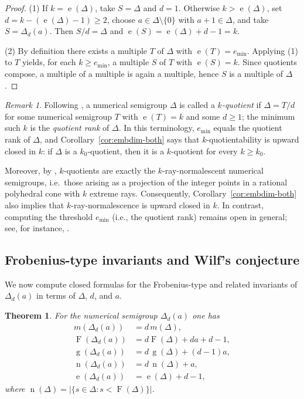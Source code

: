 \documentclass[12pt,a4paper]{amsart}
\newtheorem{theorem}{Theorem}[section]
\theoremstyle{definition}
\theoremstyle{remark}
\newtheorem*{remark}{Remark}
\begin{document}
\begin{proof}
(1) If $k=\operatorname{e}(\Delta)$, take $S=\Delta$ and $d=1$. Otherwise $k>\operatorname{e}(\Delta)$, set
$d=k-(\operatorname{e}(\Delta)-1)\ge 2$, choose $a\in\Delta\setminus\{0\}$ with $a+1\in\Delta$, and take
$S=\Delta_d(a)$. Then $S/d=\Delta$ and $\operatorname{e}(S)=\operatorname{e}(\Delta)+d-1=k$.

(2) By definition there exists a multiple $T$ of $\Delta$ with $\operatorname{e}(T)=e_{\min}$.
Applying (1) to $T$ yields, for each $k\ge e_{\min}$, a multiple $S$ of $T$ with $\operatorname{e}(S)=k$.
Since quotients compose, a multiple of a multiple is again a multiple, hence $S$ is a
multiple of $\Delta$.
\end{proof}

\begin{remark}\label{rem:quotient-rank-cones}
Following \cite{australian}, a numerical semigroup $\Delta$ is called a \emph{$k$-quotient}
if $\Delta=T/d$ for some numerical semigroup $T$ with $\operatorname{e}(T)=k$ and some $d\ge 1$; the
minimum such $k$ is the \emph{quotient rank} of $\Delta$.
In this terminology, $e_{\min}$ equals the quotient rank of $\Delta$, and
Corollary~\ref{cor:embdim-both} says that $k$-quotientability is upward closed in $k$:
if $\Delta$ is a $k_0$-quotient, then it is a $k$-quotient for every $k\ge k_0$.

Moreover, by \cite{cones}, $k$-quotients are exactly the $k$-ray-normalescent numerical
semigroups, i.e.\ those arising as a projection of the integer points in a rational
polyhedral cone with $k$ extreme rays. Consequently, Corollary~\ref{cor:embdim-both} also implies
that $k$-ray-normalescence is upward closed in $k$.
In contrast, computing the threshold $e_{\min}$ (i.e., the quotient rank) remains open in
general; see, for instance, \cite{ojeda3}.
\end{remark}

\subsection{Frobenius-type invariants and Wilf's conjecture}
We now compute closed formulas for the Frobenius-type and related invariants of $\Delta_d(a)$ in terms of $\Delta$, $d$, and $a$.

\begin{theorem}\label{th:3.3}
For the numerical semigroup $\Delta_d(a)$ one has
\begin{align*}
m(\Delta_d(a))&=d\,m(\Delta),\\
\operatorname{F}(\Delta_d(a))&=d\operatorname{F}(\Delta)+da+d-1,\\
\operatorname{g}(\Delta_d(a))&=d\,\operatorname{g}(\Delta)+(d-1)a,\\
\operatorname{n}(\Delta_d(a))&=d\,\operatorname{n}(\Delta)+a,\\
\operatorname{e}(\Delta_d(a))&=\operatorname{e}(\Delta)+d-1,
\end{align*}
where $\operatorname{n}(\Delta)=|\{s\in \Delta:s<\operatorname{F}(\Delta)\}|$.
\end{theorem}
\end{document}
